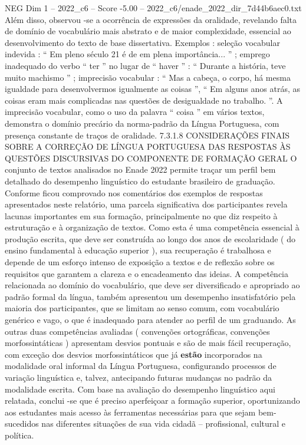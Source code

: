 \begin{textsample}{NEG Dim 1 – 2022\_c6 – Score -5.00 – 2022\_c6/enade\_2022\_dir\_7d44b6aec0.txt}
Além disso, observou -se a ocorrência de expressões da oralidade, revelando falta de domínio de vocabulário mais abstrato e de maior complexidade, essencial ao desenvolvimento do texto de base dissertativa.
Exemplos : seleção vocabular indevida : “ Em pleno século 21 é de em plena importância... ” ; emprego inadequado do verbo “ ter ” no lugar de “ haver ” : “ Durante a história, teve muito machismo ” ; imprecisão vocabular : “ Mas a cabeça, o corpo, há mesma igualdade para desenvolvermos igualmente as coisas ”, “ Em alguns anos atrás, as coisas eram mais complicadas nas questões de desigualdade no trabalho. ”.
A imprecisão vocabular, como o uso da palavra “ coisa ” em vários textos, demonstra o domínio precário da norma-padrão da Língua Portuguesa, com presença constante de traços de oralidade. 7.3.1.8 CONSIDERAÇÕES FINAIS SOBRE A CORREÇÃO DE LÍNGUA PORTUGUESA DAS RESPOSTAS ÀS QUESTÕES DISCURSIVAS DO COMPONENTE DE FORMAÇÃO GERAL O conjunto de textos analisados no Enade 2022 permite traçar um perfil bem detalhado do desempenho linguístico do estudante brasileiro de graduação.
Conforme ficou comprovado nos comentários dos exemplos de respostas apresentados neste relatório, uma parcela significativa dos participantes revela lacunas importantes em sua formação, principalmente no que diz respeito à estruturação e à organização de textos.
Como esta é uma competência essencial à produção escrita, que deve ser construída ao longo dos anos de escolaridade ( do ensino fundamental à educação superior ), sua recuperação é trabalhosa e depende de um esforço intenso de exposição a textos e de reflexão sobre os requisitos que garantem a clareza e o encadeamento das ideias.
A competência relacionada ao domínio do vocabulário, que deve ser diversificado e apropriado ao padrão formal da língua, também apresentou um desempenho insatisfatório pela maioria dos participantes, que se limitam ao senso comum, com vocabulário genérico e vago, o que é inadequado para atender ao perfil de um graduando.
As outras duas competências avaliadas ( convenções ortográficas, convenções morfossintáticas ) apresentam desvios pontuais e são de mais fácil recuperação, com exceção dos desvios morfossintáticos que já \textbf{estão} incorporados na modalidade oral informal da Língua Portuguesa, configurando processos de variação linguística e, talvez, antecipando futuras mudanças no padrão da modalidade escrita.
Com base na avaliação do desempenho linguístico aqui relatada, conclui -se que é preciso aperfeiçoar a formação superior, oportunizando aos estudantes mais acesso às ferramentas necessárias para que sejam bem-sucedidos nas diferentes situações de sua vida cidadã – profissional, cultural e política.

\end{textsample}
